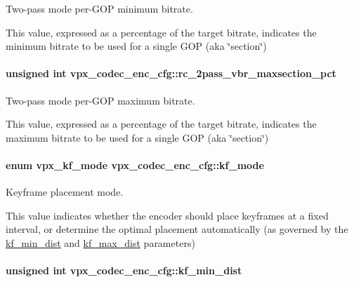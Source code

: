 Two-\/pass mode per-\/\+G\+O\+P minimum bitrate. 

This value, expressed as a percentage of the target bitrate, indicates the minimum bitrate to be used for a single G\+O\+P (aka \char`\"{}section\char`\"{}) \hypertarget{structvpx__codec__enc__cfg_ab5212050b71b2d9f4dc663caa496949e}{
\paragraph[{rc\+\_\+2pass\+\_\+vbr\+\_\+maxsection\+\_\+pct}]{\setlength{\rightskip}{0pt plus 5cm}unsigned int vpx\+\_\+codec\+\_\+enc\+\_\+cfg\+::rc\+\_\+2pass\+\_\+vbr\+\_\+maxsection\+\_\+pct}}\label{structvpx__codec__enc__cfg_ab5212050b71b2d9f4dc663caa496949e}


Two-\/pass mode per-\/\+G\+O\+P maximum bitrate. 

This value, expressed as a percentage of the target bitrate, indicates the maximum bitrate to be used for a single G\+O\+P (aka \char`\"{}section\char`\"{}) \hypertarget{structvpx__codec__enc__cfg_a491d67f061dcdb13f60c017563e9d788}{
\paragraph[{kf\+\_\+mode}]{\setlength{\rightskip}{0pt plus 5cm}enum {\bf vpx\+\_\+kf\+\_\+mode} vpx\+\_\+codec\+\_\+enc\+\_\+cfg\+::kf\+\_\+mode}}\label{structvpx__codec__enc__cfg_a491d67f061dcdb13f60c017563e9d788}


Keyframe placement mode. 

This value indicates whether the encoder should place keyframes at a fixed interval, or determine the optimal placement automatically (as governed by the \hyperlink{structvpx__codec__enc__cfg_a0a7b5444ecb09745cbe8d5af17553846}{kf\+\_\+min\+\_\+dist} and \hyperlink{structvpx__codec__enc__cfg_ae018440136e271743376730413d25a9b}{kf\+\_\+max\+\_\+dist} parameters) \hypertarget{structvpx__codec__enc__cfg_a0a7b5444ecb09745cbe8d5af17553846}{
\paragraph[{kf\+\_\+min\+\_\+dist}]{\setlength{\rightskip}{0pt plus 5cm}unsigned int vpx\+\_\+codec\+\_\+enc\+\_\+cfg\+::kf\+\_\+min\+\_\+dist}}\label{structvpx__codec__enc__cfg_a0a7b5444ecb09745cbe8d5af17553846}


